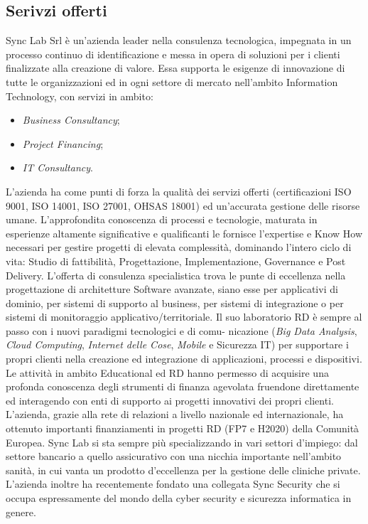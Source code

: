\subsection{Serivzi offerti}
Sync Lab Srl è un’azienda leader nella consulenza tecnologica, impegnata in un processo
continuo di identificazione e messa in opera di soluzioni per i clienti finalizzate alla
creazione di valore. Essa supporta le esigenze di innovazione di tutte le organizzazioni
ed in ogni settore di mercato nell’ambito Information Technology, con servizi in ambito:
\begin{itemize}
	\item \textit{Business Consultancy};
	\item \textit{Project Financing};
	\item \textit{IT Consultancy}.
\end{itemize}
L’azienda ha come punti di forza la qualità dei servizi offerti (certificazioni \gls{ISO} 9001,
ISO 14001, ISO 27001, OHSAS 18001) ed un’accurata gestione delle risorse umane.
L’approfondita conoscenza di processi e tecnologie, maturata in esperienze altamente
significative e qualificanti le fornisce l’expertise e Know How necessari per gestire
progetti di elevata complessità, dominando l’intero ciclo di vita: Studio di fattibilità,
Progettazione, Implementazione, Governance e Post Delivery.
L’offerta di consulenza specialistica trova le punte di eccellenza nella progettazione
di architetture Software avanzate, siano esse per applicativi di dominio, per sistemi
di supporto al business, per sistemi di integrazione o per sistemi di monitoraggio
applicativo/territoriale.
Il suo laboratorio RD è sempre al passo con i nuovi paradigmi tecnologici e di comu-
nicazione (\textit{\gls{Big Data Analysis}}, \textit{\gls{Cloud Computing}}, \textit{\gls{Internet delle Cose}},\textit{ Mobile}
e Sicurezza IT) per supportare i propri clienti nella creazione ed integrazione di
applicazioni, processi e dispositivi.
Le attività in ambito Educational ed RD hanno permesso di acquisire una profonda
conoscenza degli strumenti di finanza agevolata fruendone direttamente ed interagendo
con enti di supporto ai progetti innovativi dei propri clienti. L’azienda, grazie alla rete
di relazioni a livello nazionale ed internazionale, ha ottenuto importanti finanziamenti
in progetti RD (FP7 e H2020) della Comunità Europea.
Sync Lab si sta sempre più specializzando in vari settori d’impiego: dal settore bancario
a quello assicurativo con una nicchia importante nell’ambito sanità, in cui vanta
un prodotto d’eccellenza per la gestione delle cliniche private. L’azienda inoltre ha
recentemente fondato una collegata Sync Security che si occupa espressamente del
mondo della cyber security e sicurezza informatica in genere.
